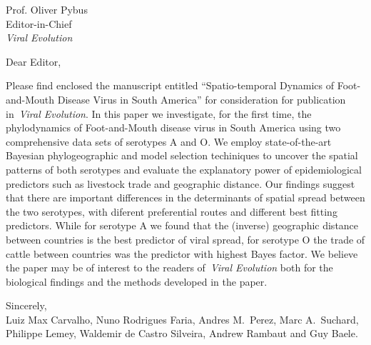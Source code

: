 \documentclass[standard, 
               backaddress=off, 
               foldmarks=false, 
               enlargefirstpage,
               pagenumber=off,
               parskip=half
               ]{scrlttr2}
\def\title{Spatio-temporal Dynamics of Foot-and-Mouth Disease Virus in South America}
\begin{document}

\begin{letter}{%
    Prof. Oliver Pybus \\%
    Editor-in-Chief\\%
    \emph{Viral Evolution}
}

\opening{Dear Editor,}

Please find enclosed the manuscript entitled “\title” for consideration for publication in~\emph{Viral Evolution}.
In this paper we investigate, for the first time, the phylodynamics of Foot-and-Mouth disease virus in South America using two comprehensive data sets of serotypes A and O.
We employ state-of-the-art Bayesian phylogeographic and model selection techiniques to uncover the spatial patterns of both serotypes and evaluate the explanatory power of epidemiological predictors such as livestock trade and geographic distance.
Our findings suggest that there are important differences in the determinants of spatial spread between the two serotypes, with diferent preferential routes and different best fitting predictors.
While for serotype A we found that the (inverse) geographic distance between countries is the best predictor of viral spread, for serotype O the trade of cattle between countries was the predictor with highest Bayes factor.
We believe the paper may be of interest to the readers of~\emph{Viral Evolution} both for the biological findings and the methods developed in the paper.

\vspace{0.1cm}
Sincerely, \\
Luiz Max Carvalho, 
Nuno Rodrigues Faria, 
Andres M.~Perez, 
Marc A.~Suchard, 
Philippe Lemey, 
Waldemir de Castro Silveira, 
Andrew Rambaut
and Guy Baele.

\end{letter}
\end{document}
